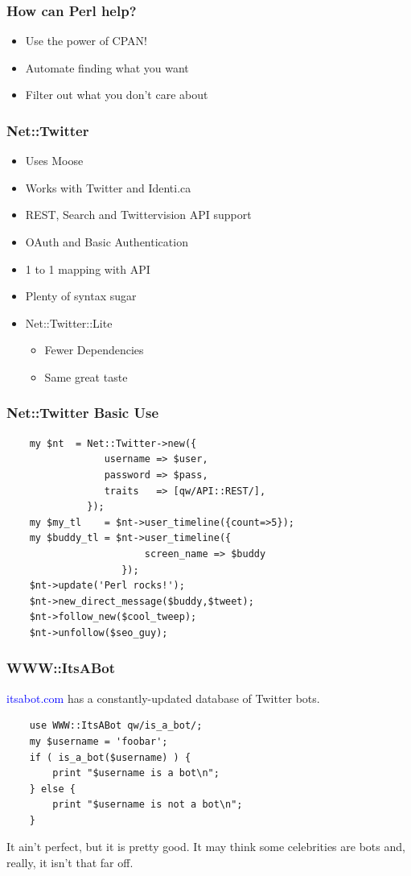 \documentclass[12pt]{beamer}
\begin{document}
\begin{frame}
    \frametitle{How can Perl help?}
    \begin{itemize}
    \item Use the power of CPAN!
    \item Automate finding what you want
    \item Filter out what you don't care about
    \end{itemize}
\end{frame}

\begin{frame}[fragile]
    \frametitle{Net::Twitter}
    \begin{itemize}
    \item Uses Moose
    \item Works with Twitter and Identi.ca
    \item REST, Search and Twittervision API support
    \item OAuth and Basic Authentication
    \item 1 to 1 mapping with API
    \item Plenty of syntax sugar
    \item Net::Twitter::Lite
        \begin{itemize}
        \item Fewer Dependencies
        \item Same great taste
        \end{itemize}
    \end{itemize}
\end{frame}

\begin{frame}[fragile]
    \frametitle{Net::Twitter Basic Use}
    \begin{small}
    \begin{verbatim}
    my $nt  = Net::Twitter->new({
                 username => $user,
                 password => $pass,
                 traits   => [qw/API::REST/],
              });
    my $my_tl    = $nt->user_timeline({count=>5});
    my $buddy_tl = $nt->user_timeline({
                        screen_name => $buddy
                    });
    $nt->update('Perl rocks!');
    $nt->new_direct_message($buddy,$tweet);
    $nt->follow_new($cool_tweep);
    $nt->unfollow($seo_guy);

    \end{verbatim}
    \end{small}
\end{frame}

\begin{frame}[fragile]
    \frametitle{WWW::ItsABot}
    \textcolor{blue}{itsabot.com} has a constantly-updated database of Twitter bots.
    \begin{verbatim}
    use WWW::ItsABot qw/is_a_bot/;
    my $username = 'foobar';
    if ( is_a_bot($username) ) {
        print "$username is a bot\n";
    } else {
        print "$username is not a bot\n";
    }
    \end{verbatim}

    It ain't perfect, but it is pretty good. It may
    think some celebrities are bots and, really,
    it isn't that far off.

\end{frame}
\end{document}
